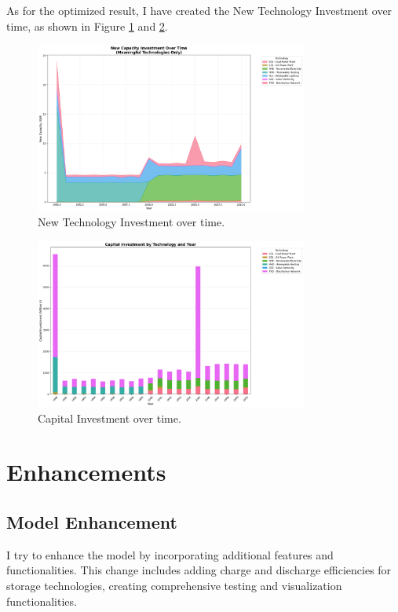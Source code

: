 \documentclass[11pt]{article}
\begin{document}
As for the optimized result, I have created the New Technology Investment over time, as shown in Figure \ref{fig:new_technology_investment} and \ref{fig:capital_investment}.
\begin{figure}[H]
    \centering
    \includegraphics[width=0.8\textwidth]{visualizations/meaningful_technology_capacity_labeled.png}
    \caption{New Technology Investment over time.}
    \label{fig:new_technology_investment}
\end{figure}    

\begin{figure}[H]
    \centering
    \includegraphics[width=0.8\textwidth]{visualizations/capital_investment_labeled.png}
    \caption{Capital Investment over time.}
    \label{fig:capital_investment}
\end{figure}    

\section{Enhancements}
\subsection{Model Enhancement}
I try to enhance the model by incorporating additional features and functionalities. This change includes adding charge and discharge efficiencies for storage technologies, creating comprehensive testing and visualization functionalities. 
\end{document}
